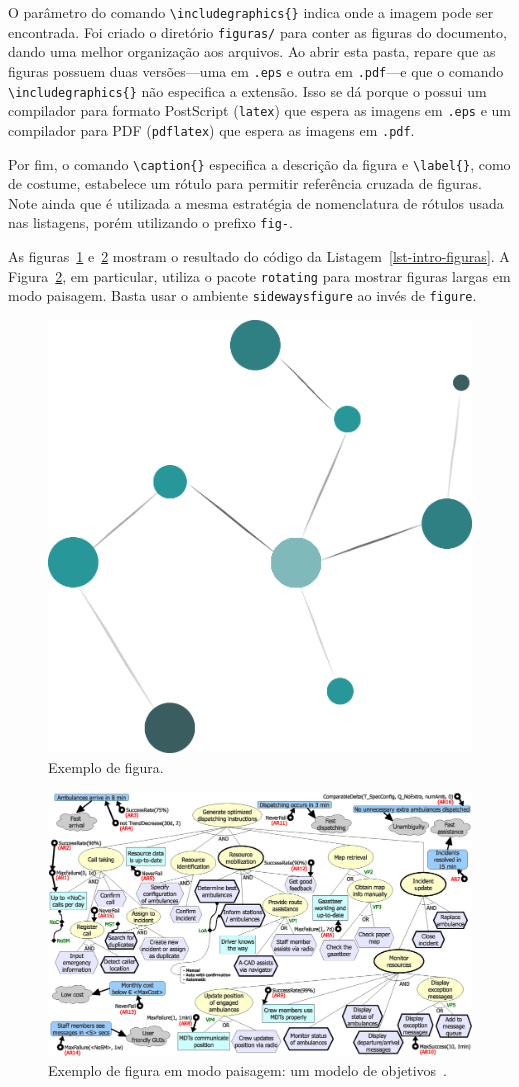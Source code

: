 O parâmetro do comando \texttt{\textbackslash includegraphics\{\}} indica onde a imagem pode ser encontrada. Foi criado o diretório \texttt{figuras/} para conter as figuras do documento, dando uma melhor organização aos arquivos. Ao abrir esta pasta, repare que as figuras possuem duas versões---uma em \texttt{.eps} e outra em \texttt{.pdf}---e que o comando \texttt{\textbackslash includegraphics\{\}} não especifica a extensão. Isso se dá porque o \latex possui um compilador para formato PostScript (\texttt{latex}) que espera as imagens em \texttt{.eps} e um compilador para PDF (\texttt{pdflatex}) que espera as imagens em \texttt{.pdf}.

Por fim, o comando \texttt{\textbackslash caption\{\}} especifica a descrição da figura e \texttt{\textbackslash label\{\}}, como de costume, estabelece um rótulo para permitir referência cruzada de figuras. Note ainda que é utilizada a mesma estratégia de nomenclatura de rótulos usada nas listagens, porém utilizando o prefixo \texttt{fig-}.

As figuras~\ref{fig-intro-nemologo} e~\ref{fig-intro-exemplosideways} mostram o resultado do código da Listagem~\ref{lst-intro-figuras}. A Figura~\ref{fig-intro-exemplosideways}, em particular, utiliza o pacote \texttt{rotating} para mostrar figuras largas em modo paisagem. Basta usar o ambiente \texttt{sidewaysfigure} ao invés de \texttt{figure}.

\begin{figure}
\centering
\includegraphics[width=.25\textwidth]{figuras/image-home.png} 
\caption{Exemplo de figura.}
\label{fig-intro-nemologo}
\end{figure}

\begin{figure}
\centering
\includegraphics[width=\textwidth]{figuras/fig-intro-exemplosideways} 
\caption{Exemplo de figura em modo paisagem: um modelo de objetivos~\cite{souza-mylopoulos:spe13}.}
\label{fig-intro-exemplosideways}
\end{figure}




